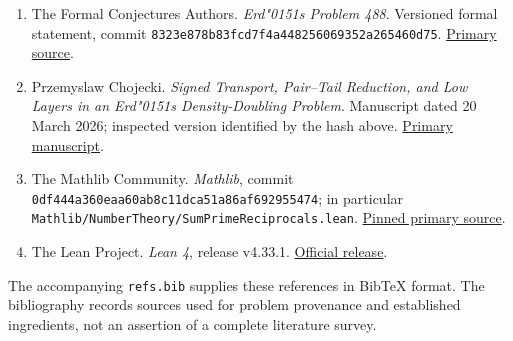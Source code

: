 \documentclass[
  11pt,
]{article}
\providecommand{\tightlist}{%
  \setlength{\itemsep}{0pt}\setlength{\parskip}{0pt}}
\newcommand{\odoubleacute}{{\accentfont\char"0151}}
\begin{document}
\begin{enumerate}\raggedright
\def\labelenumi{\arabic{enumi}.}
\tightlist
\item
  The Formal Conjectures Authors. \emph{Erd\texorpdfstring{\odoubleacute}{o}s Problem 488}. Versioned
  formal statement, commit
  \texttt{8323e878b8\allowbreak{}3fcd7f4a44\allowbreak{}8256069352\allowbreak{}a265460d75}.
  \href{https://github.com/google-deepmind/formal-conjectures/blob/8323e878b83fcd7f4a448256069352a265460d75/FormalConjectures/ErdosProblems/488.lean}{Primary
  source}.
\item
  Przemyslaw Chojecki. \emph{Signed Transport, Pair--Tail Reduction, and
  Low Layers in an Erd\texorpdfstring{\odoubleacute}{o}s Density-Doubling Problem}. Manuscript dated 20
  March 2026; inspected version identified by the hash above.
  \href{https://www.ulam.ai/research/erdos488.pdf}{Primary manuscript}.
\item
  The Mathlib Community. \emph{Mathlib}, commit
  \texttt{0df444a360\allowbreak{}eaa60ab8c1\allowbreak{}1dca51a86a\allowbreak{}f692955474}; in particular
  \texttt{Mathlib/\allowbreak{}NumberTheory/\allowbreak{}Sum\allowbreak{}Prime\allowbreak{}Reciprocals.\allowbreak{}lean}.
  \href{https://github.com/leanprover-community/mathlib4/blob/0df444a360eaa60ab8c11dca51a86af692955474/Mathlib/NumberTheory/SumPrimeReciprocals.lean}{Pinned
  primary source}.
\item
  The Lean Project. \emph{Lean 4}, release v4.33.1.
  \href{https://github.com/leanprover/lean4/releases/tag/v4.33.1}{Official
  release}.
\end{enumerate}

The accompanying \texttt{refs.\allowbreak{}bib} supplies these references in BibTeX
format. The bibliography records sources used for problem provenance and
established ingredients, not an assertion of a complete literature
survey.
\end{document}
